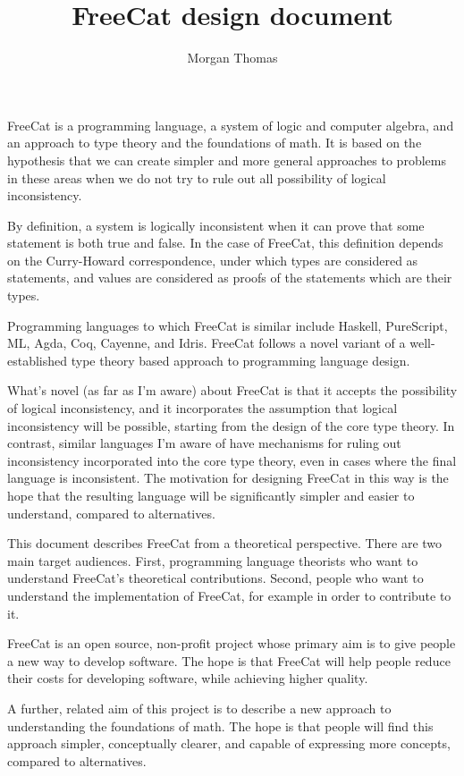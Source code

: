 \documentclass{article}
\title{FreeCat design document}
\author{Morgan Thomas}
\begin{document}
\maketitle

FreeCat is a programming language, a system of logic and computer algebra, and an approach to type theory and the foundations of math. It is based on the hypothesis that we can create simpler and more general approaches to problems in these areas when we do not try to rule out all possibility of logical inconsistency.

By definition, a system is logically inconsistent when it can prove that some statement is both true and false. In the case of FreeCat, this definition depends on the Curry-Howard correspondence, under which types are considered as statements, and values are considered as proofs of the statements which are their types.

Programming languages to which FreeCat is similar include Haskell, PureScript, ML, Agda, Coq, Cayenne, and Idris. FreeCat follows a novel variant of a well-established type theory based approach to programming language design.

What's novel (as far as I'm aware) about FreeCat is that it accepts the possibility of logical inconsistency, and it incorporates the assumption that logical inconsistency will be possible, starting from the design of the core type theory. In contrast, similar languages I'm aware of have mechanisms for ruling out inconsistency incorporated into the core type theory, even in cases where the final language is inconsistent. The motivation for designing FreeCat in this way is the hope that the resulting language will be significantly simpler and easier to understand, compared to alternatives.

This document describes FreeCat from a theoretical perspective. There are two main target audiences. First, programming language theorists who want to understand FreeCat's theoretical contributions. Second, people who want to understand the implementation of FreeCat, for example in order to contribute to it.

FreeCat is an open source, non-profit project whose primary aim is to give people a new way to develop software. The hope is that FreeCat will help people reduce their costs for developing software, while achieving higher quality.

A further, related aim of this project is to describe a new approach to understanding the foundations of math. The hope is that people will find this approach simpler, conceptually clearer, and capable of expressing more concepts, compared to alternatives.
\end{document}
